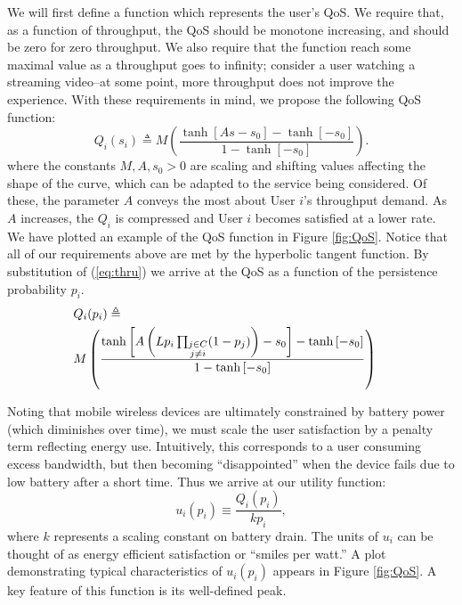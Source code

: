 \documentclass[conference]{IEEEtran}
\theoremstyle{definition}
\begin{document}
We will first define a function which represents the user's QoS.  We require that, as a function of throughput, the QoS should be
monotone increasing, and should be zero for zero throughput.  We also require that the function reach some maximal value as a throughput goes to infinity; consider a user watching a streaming video--at some point, more throughput does not improve the experience.  With these requirements in mind, we propose the following QoS function:
\begin{equation}
  Q_i(s_i) \triangleq M \left(\frac{\tanh\left[As-s_0\right] - \tanh\left[-s_0\right]}{1-\tanh\left[-s_0\right]}\right).
  \label{eq:qos1}
\end{equation}
where the constants $M, A, s_0 > 0$ are scaling and shifting values affecting the shape of the curve, which can be adapted to the service being considered. Of these, the parameter $A$ conveys the most about User $i$'s throughput demand. As $A$ increases, the $Q_i$ is compressed and User $i$ becomes satisfied at a lower rate. We have plotted an example of the QoS function in Figure \ref{fig:QoS}. Notice that all of our requirements above are met by the hyperbolic tangent function. By substitution of (\ref{eq:thru}) we arrive at the QoS as a function of the persistence probability $p_i$.
\begin{eqnarray}
  \lefteqn{Q_i(p_i) \triangleq}\nonumber\\
  & M \left(\frac{\tanh\left[A\left(L p_i \prod_{\substack{j \in C\\j \neq i}} (1-p_j)\right)-s_0\right] - \tanh\left[-s_0\right]}{1-\tanh\left[-s_0\right]}\right)
\end{eqnarray}

Noting that mobile wireless devices are ultimately constrained by battery power (which diminishes over time), we must scale the user satisfaction by a penalty term reflecting energy use.  Intuitively, this corresponds to a user consuming excess bandwidth, but then becoming ``disappointed'' when the device fails due to low battery after a short time. Thus we arrive at our utility function:
\begin{equation}
  u_i(p_i) \equiv \frac{Q_i(p_i)}{kp_i},
  \label{eq:util}
\end{equation}
where $k$ represents a scaling constant on battery drain.  The units of $u_i$ can be thought of as energy efficient satisfaction or ``smiles per watt.'' A plot demonstrating typical characteristics of $u_i(p_i)$ appears in Figure \ref{fig:QoS}.  A key feature of this function is its well-defined peak.
\end{document}

